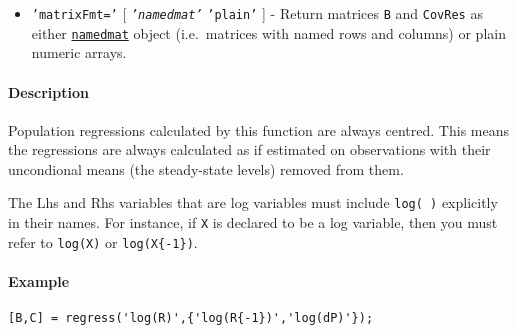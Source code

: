 \begin{itemize}
\itemsep1pt\parskip0pt
\item
  \texttt{'matrixFmt='} {[} \emph{\texttt{'namedmat'}} \textbar{}
  \texttt{'plain'} {]} - Return matrices \texttt{B} and \texttt{CovRes}
  as either \href{namedmat/Contents}{\texttt{namedmat}} object
  (i.e.~matrices with named rows and columns) or plain numeric arrays.
\end{itemize}

\paragraph{Description}

Population regressions calculated by this function are always centred.
This means the regressions are always calculated as if estimated on
observations with their uncondional means (the steady-state levels)
removed from them.

The Lhs and Rhs variables that are log variables must include
\texttt{log( )} explicitly in their names. For instance, if \texttt{X}
is declared to be a log variable, then you must refer to \texttt{log(X)}
or \texttt{log(X\{-1\})}.

\paragraph{Example}

\begin{verbatim}
[B,C] = regress('log(R)',{'log(R{-1})','log(dP)'});
\end{verbatim}


